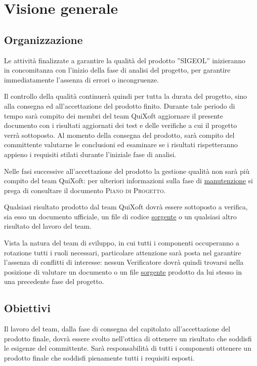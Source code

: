 \documentclass[11pt,a4paper]{article}
\begin{document}
\section{Visione generale}
\subsection{Organizzazione} 
Le attività finalizzate a garantire la qualità del prodotto ''SIGEOL'' inizieranno in concomitanza con l'inizio della fase di analisi del progetto, per garantire immediatamente l'assenza di errori o incongruenze.

Il controllo della qualità continuerà quindi per tutta la durata del progetto, sino alla consegna ed all'accettazione del prodotto finito. Durante tale periodo di tempo sarà compito dei membri del team QuiXoft aggiornare il presente documento con i risultati aggiornati dei test e delle verifiche a cui il progetto verrà sottoposto. Al momento della consegna del prodotto, sarà compito del committente valutarne le conclusioni ed esaminare se i risultati rispetteranno appieno i requisiti stilati durante l'iniziale fase di analisi.

Nelle fasi successive all'accettazione del prodotto la gestione qualità non sarà più compito del team QuiXoft: per ulteriori informazioni sulla fase di \underline{manutenzione} si prega di consultare il documento \textsc{Piano di Progetto}.

Qualsiasi risultato prodotto dal team QuiXoft dovrà essere sottoposto a verifica, sia esso un documento ufficiale, un file di codice \underline{sorgente} o un qualsiasi altro risultato del lavoro del team.

Vista la natura del team di sviluppo, in cui tutti i componenti occuperanno a rotazione tutti i ruoli necessari, particolare attenzione sarà posta nel garantire l'assenza di conflitti di interesse: nessun Verificatore dovrà quindi trovarsi nella posizione di valutare un documento o un file \underline{sorgente} prodotto da lui stesso in una precedente fase del progetto.

\subsection{Obiettivi}
Il lavoro del team, dalla fase di consegna del capitolato all'accettazione del prodotto finale, dovrà essere svolto nell'ottica di ottenere un risultato che soddisfi le esigenze del committente. Sarà responsabilità di tutti i componenti ottenere un prodotto finale che soddisfi pienamente tutti i requisiti esposti.
\end{document}

